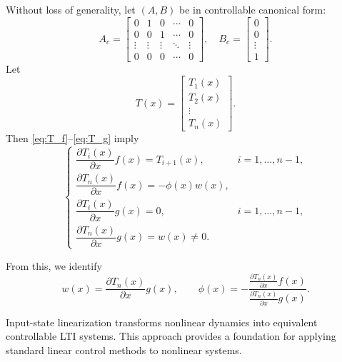 \noindent Without loss of generality, let $(A, B)$ be in controllable canonical form:
\begin{equation}
A_c =
\begin{bmatrix}
0 & 1 & 0 & \cdots & 0 \\
0 & 0 & 1 & \cdots & 0 \\
\vdots & \vdots & \vdots & \ddots & \vdots \\
0 & 0 & 0 & \cdots & 0
\end{bmatrix}, \quad
B_c =
\begin{bmatrix}
0 \\ 0 \\ \vdots \\ 1
\end{bmatrix}.
\end{equation}
Let
\begin{equation}
T(x) =
\begin{bmatrix}
T_1(x) \\ T_2(x) \\ \vdots \\ T_n(x)
\end{bmatrix}.
\end{equation}
Then \eqref{eq:T_f}–\eqref{eq:T_g} imply
\begin{equation}
\begin{cases}
\dfrac{\partial T_i(x)}{\partial x} f(x) = T_{i+1}(x), & i = 1, \ldots, n-1,\\[8pt]
\dfrac{\partial T_n(x)}{\partial x} f(x) = -\phi(x) w(x), \\[8pt]
\dfrac{\partial T_i(x)}{\partial x} g(x) = 0, & i = 1, \ldots, n-1,\\[8pt]
\dfrac{\partial T_n(x)}{\partial x} g(x) = w(x) \neq 0.
\end{cases}
\end{equation}

From this, we identify
\begin{equation}
w(x) = \frac{\partial T_n(x)}{\partial x} g(x),
\qquad
\phi(x) = -\frac{\frac{\partial T_n(x)}{\partial x} f(x)}{\frac{\partial T_n(x)}{\partial x} g(x)}.
\end{equation}

\begin{remark}
Input-state linearization transforms nonlinear dynamics into equivalent controllable LTI systems.  
This approach provides a foundation for applying standard linear control methods to nonlinear systems.
\end{remark}

